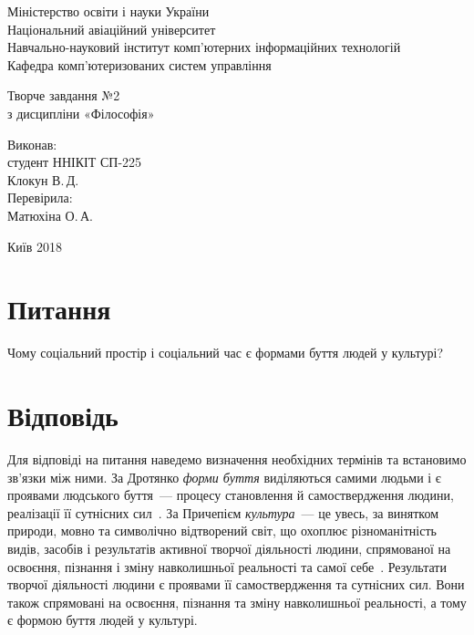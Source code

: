 \documentclass[a4paper,oneside,DIV = 12, 12pt, headings = normal]{scrartcl}
\begin{document}
	\begin{titlepage}
	\centering
		Міністерство освіти і науки України\\
		Національний авіаційний університет\\
		Навчально-науковий інститут комп'ютерних інформаційних технологій\\
		Кафедра комп'ютеризованих систем управління

		\vspace*{\fill}

		Творче завдання №2\\
		з дисципліни «Філософія»\\

		\vspace*{\fill}
		
		\begin{flushright}
			Виконав:\\
			студент ННІКІТ СП-225\\
			Клокун В.\,Д.\\
			Перевірила:\\
			Матюхіна О.\,А.
		\end{flushright}

		Київ 2018
    \end{titlepage}
	
	\section{Питання}
		Чому соціальний простір і соціальний час є формами буття людей у культурі?
	
	\section{Відповідь}
		Для відповіді на питання наведемо визначення необхідних термінів та встановимо зв'язки між ними. За Дротянко \emph{форми буття} виділяються самими людьми і є проявами людського буття~— процесу становлення й самоствердження людини, реалізації її сутнісних сил~\cite[244--245]{drotyanko-textbook}. За Причепієм \emph{культура}~— це увесь, за винятком природи, мовно та символічно відтворений світ, що охоплює різноманітність видів, засобів і результатів активної творчої діяльності людини, спрямованої на освоєння, пізнання і зміну навколишньої реальності та самої себе~\cite[373]{prichepiy-textbook}. Результати творчої діяльності людини є проявами її самоствердження та сутнісних сил. Вони також спрямовані на освоєння, пізнання та зміну навколишньої реальності, а тому є формою буття людей у культурі.
		
\end{document}
